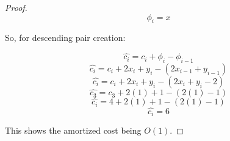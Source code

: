 \documentclass[11pt]{article}
\begin{document}
\begin{enumerate}
\begin{proof}
$$
\phi_i = x
$$

So, for descending pair creation:

$$
\hat{c_i} = c_i + \phi_i - \phi_{i-1}
$$
$$
\hat{c_i} = c_i + 2x_i + y_i - (2x_{i-1} + y_{i-1})
$$
$$
\hat{c_i} = c_i + 2x_i + y_i - (2x_i + y_i - 2)
$$
$$
\hat{c_3} = c_3 + 2(1) + 1 - (2(1) - 1)
$$
$$
\hat{c_i} = 4 + 2(1) + 1 - (2(1) - 1)
$$
$$
\hat{c_i} = 6
$$

This shows the amortized cost being $O(1)$.

\end{proof}

\end{enumerate}

\end{document}
